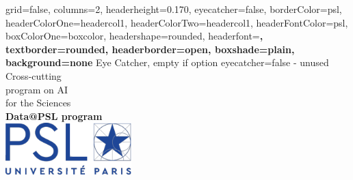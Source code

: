 \documentclass[a4paper,portrait,fontscale=0.8]{baposter}
\makeatletter
\newcommand{\data}{{\color{psl}\sc Data@PSL }}
\makeatother
\begin{document}
	

\color{standardfontcolor}

\begin{poster}{
    grid=false,
    columns=2,
    headerheight=0.170\textheight,
    eyecatcher=false, 
    borderColor=psl,
    headerColorOne=headercol1,
    headerColorTwo=headercol1,
    headerFontColor=psl,
    boxColorOne=boxcolor,
    headershape=rounded,
    headerfont=\bfseries\Large,
    textborder=rounded,
    headerborder=open,
    boxshade=plain,
    background=none
  }
	{
		Eye Catcher, empty if option eyecatcher=false - unused
	}
%
{ 
  { {\color{psl} Cross-cutting\\[1ex] program on AI \\[1ex] for the Sciences}\\[1ex]
  }
}
{%
  \color{standardfontcolor}    {\bf \data program}\\\vspace{2ex}
}
{\includegraphics[height=2cm]{LOGO-PSL.png}} 
%
%






\end{poster}
\end{document}

